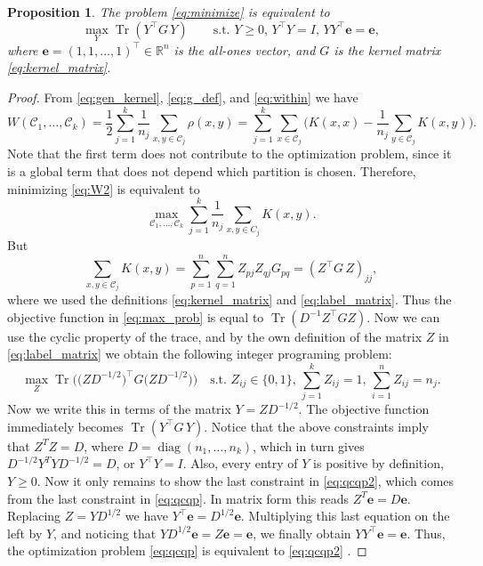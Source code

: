 \documentclass[aps,preprint,nofootinbib,floatfix]{revtex4-1}
\newtheorem{proposition}[theorem]{Proposition}
\DeclareMathOperator{\diag}{diag}
\DeclareMathOperator{\Tr}{Tr}
\newcommand\kk{K}
\newcommand\C{{\mathcal{C}}}
\newcommand\Zt{Y}
\begin{document}
\begin{proposition} 
\label{th:qcqp2}
The problem \eqref{eq:minimize} is equivalent to
\begin{equation}
\label{eq:qcqp2}
\max_{\Zt} \Tr \left( \Zt^\top G \, \Zt \right)  \qquad
\mbox{s.t. $\Zt \ge 0$, $\Zt^\top \Zt = I$, 
$\Zt \Zt^\top \bm{e} = \bm{e}$},
\end{equation}
where $\bm{e} = (1,1,\dots,1)^\top \in \mathbb{R}^n$ is the all-ones vector,
and $G$ is the kernel matrix \eqref{eq:kernel_matrix}.
\end{proposition}
\begin{proof}
From 
\eqref{eq:gen_kernel},
\eqref{eq:g_def}, and
\eqref{eq:within}
we have
\begin{equation}
\label{eq:W2}
W(\C_1,\dotsc,\C_k  )
= \dfrac{1}{2} \sum_{j=1}^k \dfrac{1}{n_j} \sum_{x,y \in \C_j} \rho(x,y)
= \sum_{j=1}^k \sum_{x \in \C_j}  \bigg(
\kk(x,x) - \dfrac{1}{n_j} \sum_{y \in \C_j} \kk(x,y) \bigg).
\end{equation}
Note that the first term does not contribute to the optimization problem,
since it is a global term that does not depend which partition is chosen. 
Therefore, minimizing \eqref{eq:W2} is equivalent to
\begin{equation}
\label{eq:max_prob}
\max_{ \C_1,\dotsc,\C_k } 
\sum_{j=1}^k \dfrac{1}{n_j} \sum_{x,y\in C_j} \kk(x,y) .
\end{equation}
But 
\begin{equation}
\sum_{x, y \in \C_j} \kk(x, y) =
\sum_{p=1}^{n} \sum_{q=1}^{n} Z_{pj} Z_{qj} G_{pq} = 
(Z^\top G \, Z)_{jj},
\end{equation}
where we used the definitions \eqref{eq:kernel_matrix} and
\eqref{eq:label_matrix}. Thus the objective function in 
\eqref{eq:max_prob} is equal to
$\Tr \left( D^{-1} Z^\top G Z \right)$. Now we can
use the cyclic property
of the trace, and by the own definition of the matrix $Z$
in \eqref{eq:label_matrix} we obtain the following integer
programing problem:
\begin{equation}\label{eq:qcqp}
\max_{Z} \Tr\Big( \big( Z D^{-1/2}\big)^\top G 
\big( ZD^{-1/2} \big) 
\Big) \quad
\mbox{s.t. $Z_{ij} \in \{0,1\}$, $\sum_{j=1}^k Z_{ij} = 1$, 
$\sum_{i=1}^n Z_{ij} = n_j$.}
\end{equation}
Now we write this in terms of the matrix $Y = Z D^{-1/2}$.
The objective function immediately becomes
$\Tr\left( Y^\top G \, Y\right)$. Notice that the above constraints
imply that $Z^T Z = D$, where $D=\diag(n_1,\dotsc,n_k)$, which in turn gives
$D^{-1/2} Y^T Y D^{-1/2} = D$, or $Y^\top Y = I$. 
Also, every entry of $Y$ is positive by definition,
$Y \ge 0$. Now it only remains to show the last 
constraint in \eqref{eq:qcqp2}, which comes from the last
constraint in \eqref{eq:qcqp}. In matrix form this reads
$Z^T \bm{e} = D \bm{e}$. Replacing $Z=YD^{1/2}$ we have
$Y^\top \bm{e} = D^{1/2} \bm{e}$. Multiplying this last equation
on the left by $Y$, and noticing
that $Y D^{1/2} \bm{e} = Z \bm{e} = \bm{e}$, we finally obtain
$Y Y^\top \bm{e} = \bm{e}$. Thus, the optimization 
problem \eqref{eq:qcqp} is equivalent
to \eqref{eq:qcqp2} .
\end{proof}
\end{document}
